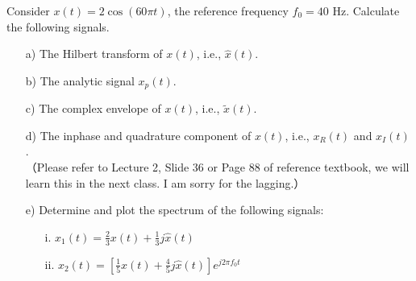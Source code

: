 \documentclass{assignment}
\begin{document}
\begin{prob}
    Consider $x(t)=2\cos(60\pi t)$, the reference frequency $f_0=40$ Hz. Calculate the following signals.
    \begin{itemize}
        \item[a)] The Hilbert transform of $x(t)$, i.e., $\hat{x}(t)$.
        \item[b)] The analytic signal $x_p(t)$.
        \item[c)] The complex envelope of $x(t)$, i.e., $\tilde{x}(t)$.
        \item[d)] The inphase and quadrature component of $x(t)$, i.e., $x_R(t)$ and $x_I(t)$.\\
        （Please refer to Lecture 2, Slide 36 or Page 88 of reference textbook, we will learn this in the next class. I am sorry for the lagging.）
        \item[e)] Determine and plot the spectrum of the following signals:
        \begin{itemize}
            \item[i.] $x_1(t)=\frac{2}{3}x(t)+\frac{1}{3}j\hat{x}(t)$
            \item[ii.] $x_2(t)=\left[\frac{1}{5}x(t)+\frac{4}{5}j\hat{x}(t)\right]e^{j2\pi f_0t}$
        \end{itemize}
    \end{itemize}
\end{prob}
\end{document}
